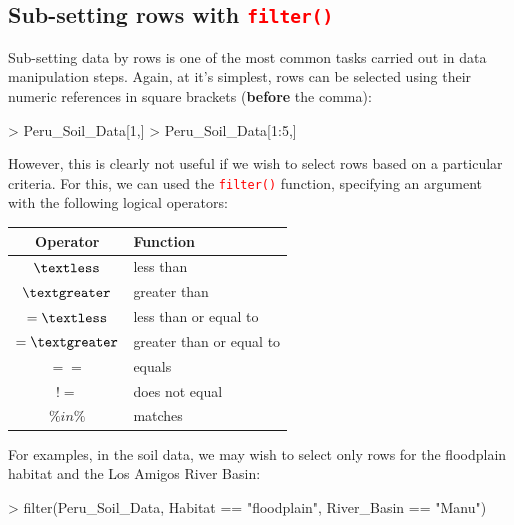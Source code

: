 \documentclass[a4paper,12pt]{article}
\newcommand\code[1]{\textcolor{red}{\texttt{#1}}}
\begin{document}
\subsection{Sub-setting rows with \code{filter()}}

Sub-setting data by rows is one of the most common tasks carried out in data manipulation steps. Again, at it's simplest, rows can be selected using their numeric references in square brackets (\textbf{before} the comma):

\begin{shaded}
\begin{Schunk}
\begin{Sinput}
> Peru_Soil_Data[1,]
> Peru_Soil_Data[1:5,]
\end{Sinput}
\end{Schunk}
\end{shaded}

However, this is clearly not useful if we wish to select rows based on a particular criteria. For this, we can used the \code{filter()} function, specifying an argument with the following logical operators:

\begin{table}[h]
	\centering
	\begin{tabular}{cl}
		
		Operator & Function \\ \hline
		$\textless$ & less than \\
		$\textgreater$ & greater than\\
		$=\textless$ & less than or equal to\\
		$=\textgreater$ & greater than or equal to\\
		$==$ & equals \\
		$!=$ & does not equal \\
		$\%in\%$ & matches \\

	\end{tabular}
	 
	\label{tbl:Boolean}
\end{table}

For examples, in the soil data, we may wish to select only rows for the floodplain habitat and the Los Amigos River Basin:

\begin{shaded}
\begin{Schunk}
\begin{Sinput}
> filter(Peru_Soil_Data, Habitat == "floodplain", River_Basin == "Manu")
\end{Sinput}
\end{Schunk}
\end{shaded}
\end{document}
